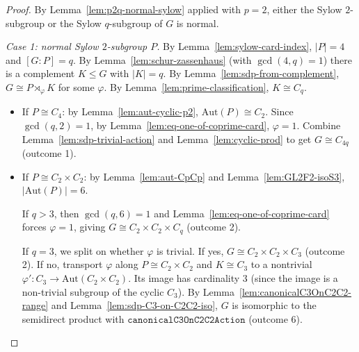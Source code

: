 \begin{proof}
    By Lemma~\ref{lem:p2q-normal-sylow} applied with $p = 2$, either the
    Sylow $2$-subgroup or the Sylow $q$-subgroup of $G$ is normal.

    \emph{Case 1: normal Sylow $2$-subgroup $P$.} By
    Lemma~\ref{lem:sylow-card-index}, $|P| = 4$ and $[G:P] = q$. By
    Lemma~\ref{lem:schur-zassenhaus} (with $\gcd(4, q) = 1$) there is a
    complement $K \leq G$ with $|K| = q$. By
    Lemma~\ref{lem:sdp-from-complement}, $G \cong P \rtimes_\varphi K$ for
    some $\varphi$. By Lemma~\ref{lem:prime-classification}, $K \cong C_q$.

    \begin{itemize}
        \item If $P \cong C_4$: by Lemma~\ref{lem:aut-cyclic-p2},
            $\mathrm{Aut}(P) \cong C_2$. Since $\gcd(q, 2) = 1$, by
            Lemma~\ref{lem:eq-one-of-coprime-card}, $\varphi = 1$. Combine
            Lemma~\ref{lem:sdp-trivial-action} and
            Lemma~\ref{lem:cyclic-prod} to get $G \cong C_{4q}$ (outcome 1).

        \item If $P \cong C_2 \times C_2$: by Lemma~\ref{lem:aut-CpCp} and
            Lemma~\ref{lem:GL2F2-isoS3}, $|\mathrm{Aut}(P)| = 6$.

            If $q > 3$, then $\gcd(q, 6) = 1$ and
            Lemma~\ref{lem:eq-one-of-coprime-card} forces $\varphi = 1$,
            giving $G \cong C_2 \times C_2 \times C_q$ (outcome 2).

            If $q = 3$, we split on whether $\varphi$ is trivial.
            If yes, $G \cong C_2 \times C_2 \times C_3$ (outcome 2). If no,
            transport $\varphi$ along $P \cong C_2 \times C_2$ and
            $K \cong C_3$ to a nontrivial
            $\varphi' : C_3 \to \mathrm{Aut}(C_2 \times C_2)$. Its image has
            cardinality $3$ (since the image is a non-trivial subgroup of the
            cyclic $C_3$). By Lemma~\ref{lem:canonicalC3OnC2C2-range} and
            Lemma~\ref{lem:sdp-C3-on-C2C2-iso}, $G$ is isomorphic to the
            semidirect product with $\mathtt{canonicalC3OnC2C2Action}$
            (outcome 6).
    \end{itemize}


\end{proof}
